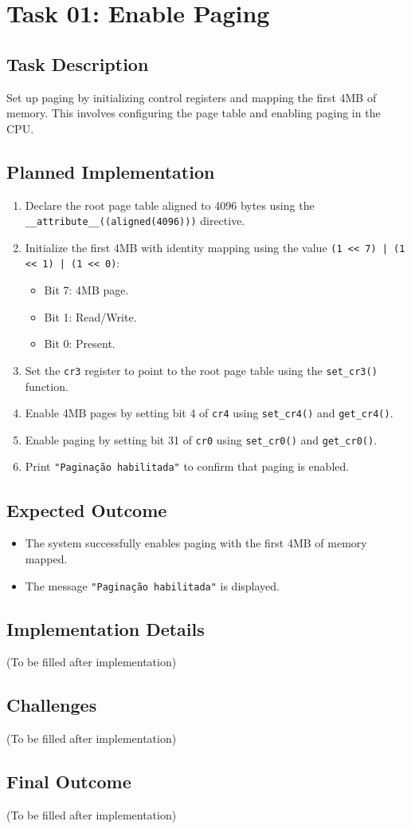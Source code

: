 \documentclass[a4paper,12pt]{report}
\begin{document}
\chapter{Task 01: Enable Paging}

\section{Task Description}
Set up paging by initializing control registers and mapping the first 4MB of memory. This involves configuring the page table and enabling paging in the CPU.

\section{Planned Implementation}
\begin{enumerate}
    \item Declare the root page table aligned to 4096 bytes using the \texttt{\_\_attribute\_\_((aligned(4096)))} directive.
    \item Initialize the first 4MB with identity mapping using the value \texttt{(1 << 7) | (1 << 1) | (1 << 0)}:
    \begin{itemize}
        \item Bit 7: 4MB page.
        \item Bit 1: Read/Write.
        \item Bit 0: Present.
    \end{itemize}
    \item Set the \texttt{cr3} register to point to the root page table using the \texttt{set\_cr3()} function.
    \item Enable 4MB pages by setting bit 4 of \texttt{cr4} using \texttt{set\_cr4()} and \texttt{get\_cr4()}.
    \item Enable paging by setting bit 31 of \texttt{cr0} using \texttt{set\_cr0()} and \texttt{get\_cr0()}.
    \item Print \texttt{"Paginação habilitada"} to confirm that paging is enabled.
\end{enumerate}

\section{Expected Outcome}
\begin{itemize}
    \item The system successfully enables paging with the first 4MB of memory mapped.
    \item The message \texttt{"Paginação habilitada"} is displayed.
\end{itemize}

\section{Implementation Details}
(To be filled after implementation)

\section{Challenges}
(To be filled after implementation)

\section{Final Outcome}
(To be filled after implementation)
\end{document}
